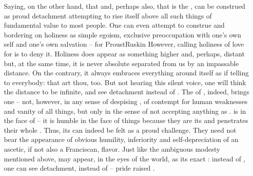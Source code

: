 %
Saying, on the other hand, that  and, perhaps also, that
  is the , can be construed as proud detachment
 attempting to rise itself above all such things of fundamental value to most
 people. One can even attempt to construe  and  bordering on
holiness as simple egoism, exclusive preoccupation with one's own self and one's
own salvation -- for \citet{that love occupies the highest place in the
hierarchy of egoisms does not change the fact that it is
egoistic.}{ProustRuskin}{}  
However, calling holiness of love for  is to deny it. Holiness
does appear as 
something higher and, perhaps, distant but, at the same time, it is
never absolute  separated from us by an impassable
distance. On the contrary, it always embraces everything around itself as if
telling to everybody: that art thou, too. But not hearing this silent voice, one
will think the distance to be infinite, and see detachment instead of .
The  of , indeed, brings one  -- not, however, in any sense of despising , of contempt
for human weaknesses and vanity of all things, but only in the sense of
not accepting anything  as .  is
 in the face of  -- it is humble in the face of
 things because they are its  and 
penetrates their whole . Thus, its 
can indeed be felt as a proud challenge. They 
need not
bear the appearance of obvious humility, inferiority and self-depreciation of an
ascetic, if not also a Franciscan, flavor.  Just like the ambiguous
modesty mentioned above,  may appear, in the eyes of the world, as
its exact : instead of , one can see
detachment, instead of  -- pride raised .


